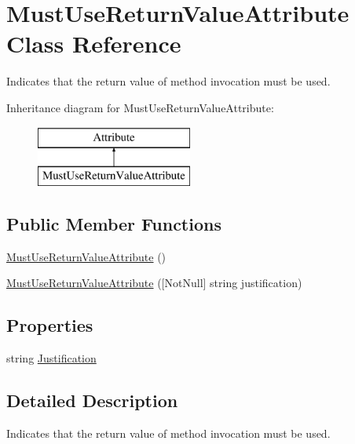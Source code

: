 \hypertarget{class_must_use_return_value_attribute}{}\section{Must\+Use\+Return\+Value\+Attribute Class Reference}
\label{class_must_use_return_value_attribute}


Indicates that the return value of method invocation must be used.  


Inheritance diagram for Must\+Use\+Return\+Value\+Attribute\+:\begin{figure}[H]
\begin{center}
\leavevmode
\includegraphics[height=2.000000cm]{class_must_use_return_value_attribute}
\end{center}
\end{figure}
\subsection*{Public Member Functions}
\begin{DoxyCompactItemize}
\item 
\mbox{\hyperlink{class_must_use_return_value_attribute_a2ebf268b3db0de70f2660df8ed324f39}{Must\+Use\+Return\+Value\+Attribute}} ()
\item 
\mbox{\hyperlink{class_must_use_return_value_attribute_add5df7b55c856f3bdaf72def203f7eab}{Must\+Use\+Return\+Value\+Attribute}} (\mbox{[}Not\+Null\mbox{]} string justification)
\end{DoxyCompactItemize}
\subsection*{Properties}
\begin{DoxyCompactItemize}
\item 
string \mbox{\hyperlink{class_must_use_return_value_attribute_a1cc4e1cefc25bbf346a0c292b09d541b}{Justification}}
\end{DoxyCompactItemize}


\subsection{Detailed Description}
Indicates that the return value of method invocation must be used. 



